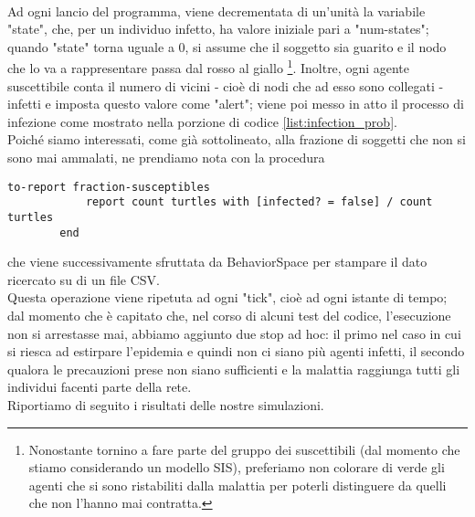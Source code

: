 \\Ad ogni lancio del programma, viene decrementata di un'unità la variabile "state", che, per un individuo infetto, ha valore iniziale pari a "num-states"; quando "state" torna uguale a $ 0 $, si assume che il soggetto sia guarito e il nodo che lo va a rappresentare passa dal rosso al giallo \footnote{Nonostante tornino a fare parte del gruppo dei suscettibili (dal momento che stiamo considerando un modello SIS), preferiamo non colorare di verde gli agenti che si sono ristabiliti dalla malattia per poterli distinguere da quelli che non l'hanno mai contratta.}. Inoltre, ogni agente suscettibile conta il numero di vicini - cioè di nodi che ad esso sono collegati - infetti e imposta questo valore come "alert"; viene poi messo in atto il processo di infezione come mostrato nella porzione di codice \ref{list:infection_prob}. \\Poiché siamo interessati, come già sottolineato, alla frazione di soggetti che non si sono mai ammalati, ne prendiamo nota con la procedura 
\begin{center}
	\begin{lstlisting}[autogobble,language={NetLogo},caption={Metodo che riporta la frazione di suscettibili che non hanno mai contratto l'infezione.},label={list:count_susceptibles}]
		to-report fraction-susceptibles
  			report count turtles with [infected? = false] / count turtles
		end	
	\end{lstlisting}
\end{center}
che viene successivamente sfruttata da BehaviorSpace per stampare il dato ricercato su di un file CSV. \\ Questa operazione viene ripetuta ad ogni "tick", cioè ad ogni istante di tempo; dal momento che è capitato che, nel corso di alcuni test del codice, l'esecuzione non si arrestasse mai, abbiamo aggiunto due stop ad hoc: il primo nel caso in cui si riesca ad estirpare l'epidemia e quindi non ci siano più agenti infetti, il secondo qualora le precauzioni prese non siano sufficienti e la malattia raggiunga tutti gli individui facenti parte della rete.\\Riportiamo di seguito i risultati delle nostre simulazioni.
